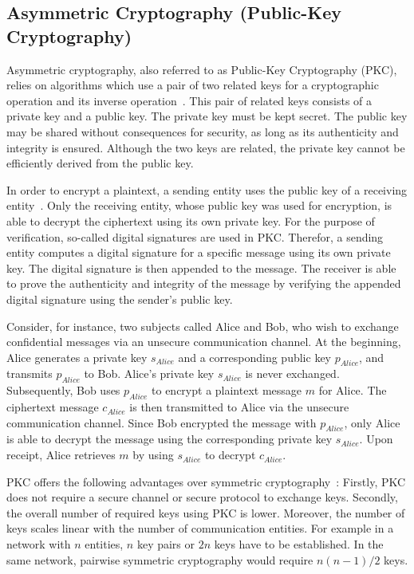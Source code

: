 \subsection{Asymmetric Cryptography (Public-Key Cryptography)}
Asymmetric cryptography, also referred to as Public-Key Cryptography (PKC), relies on algorithms which use a pair of two related keys for a cryptographic operation and its inverse operation~\cite{Barker2020,CNSS2022,Eckert2023}.
This pair of related keys consists of a private key and a public key.
The private key must be kept secret.
The public key may be shared without consequences for security, as long as its authenticity and integrity is ensured.
Although the two keys are related, the private key cannot be efficiently derived from the public key.

In order to encrypt a plaintext, a sending entity uses the public key of a receiving entity~\cite{Boneh2023}.
Only the receiving entity, whose public key was used for encryption, is able to decrypt the ciphertext using its own private key.
For the purpose of verification, so-called digital signatures are used in PKC.
Therefor, a sending entity computes a digital signature for a specific message using its own private key.
The digital signature is then appended to the message.
The receiver is able to prove the authenticity and integrity of the message by verifying the appended digital signature using the sender's public key.

Consider, for instance, two subjects called Alice and Bob, who wish to exchange confidential messages via an unsecure communication channel.
At the beginning, Alice generates a private key $s_{Alice}$ and a corresponding public key $p_{Alice}$, and transmits $p_{Alice}$ to Bob.
Alice's private key $s_{Alice}$ is never exchanged.
Subsequently, Bob uses $p_{Alice}$ to encrypt a plaintext message $m$ for Alice.
The ciphertext message $c_{Alice}$ is then transmitted to Alice via the unsecure communication channel.
Since Bob encrypted the message with $p_{Alice}$, only Alice is able to decrypt the message using the corresponding private key $s_{Alice}$.
Upon receipt, Alice retrieves $m$ by using $s_{Alice}$ to decrypt $c_{Alice}$.

PKC offers the following advantages over symmetric cryptography~\cite{Barker2020,Eckert2023}:
Firstly, PKC does not require a secure channel or secure protocol to exchange keys.
Secondly, the overall number of required keys using PKC is lower.
Moreover, the number of keys scales linear with the number of communication entities.
For example in a network with $n$ entities, $n$ key pairs or $2n$ keys have to be established.
In the same network, pairwise symmetric cryptography would require $n(n-1)/2$ keys.

